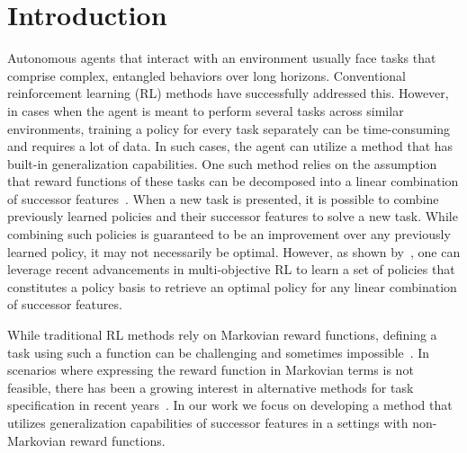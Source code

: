 \section{Introduction}
Autonomous agents that interact with an environment usually face tasks  that comprise complex, entangled behaviors over long horizons. Conventional reinforcement learning (RL) methods have successfully addressed this.  However, in cases when the agent is meant to perform several tasks across similar environments, training a policy for every task separately can be time-consuming and requires a lot of data. In such cases, the agent can utilize a method that has built-in generalization capabilities. One such method relies on the assumption that reward functions of these tasks can be decomposed into a linear combination of successor features~\citep{Barreto2017}. When a new task is presented, it is possible to combine previously learned policies and their successor features to solve a new task. %
While combining such policies is guaranteed to be an improvement over any previously learned policy, it may not necessarily be optimal. 
However, as shown by~\citep{Alegre2022}, %
one can leverage recent advancements in multi-objective RL to learn a set of policies that constitutes a policy basis to retrieve an optimal policy for any linear combination of successor features. 

While traditional RL methods rely on Markovian reward functions, defining a task using such a function can be challenging and sometimes impossible~\citep{Whitehead1995}. In scenarios where expressing the reward function in Markovian terms is not feasible, there has been a growing interest in alternative methods for task specification in recent years~\citep{Icarte2022, Camacho2019}. 
In our work we focus on developing a method that utilizes generalization capabilities of successor features in a settings with non-Markovian reward functions.

